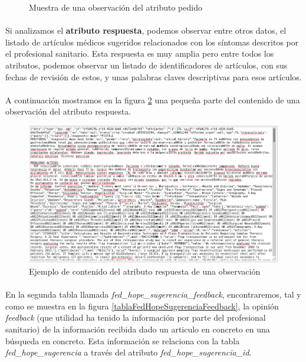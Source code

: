 \documentclass[10pt,a4paper,oneside]{book}
\begin{document}
\begin{figure}[!htb]
  \centering
    \lstset{inputencoding=utf8/latin1}
    
    \caption{Muestra de una observación del atributo pedido}
  \label{atributoPedido}
\end{figure}

\paragraph{}
Si analizamos el \textbf{atributo respuesta}, podemos observar entre otros datos, el listado de artículos médicos sugeridos relacionados con los síntomas descritos por el profesional sanitario. Esta respuesta es muy amplia pero entre todos los atributos, podemos observar un listado de identificadores de artículos, con sus fechas de revisión de estos, y unas palabras claves descriptivas para esos artículos.

\paragraph{}
A continuación mostramos en la figura \ref{atributoRespuesta} una pequeña parte del contenido de una observación del atributo respuesta.
\begin{figure}[!htb]
  \centering
    \includegraphics[width=15cm]{images/metodologia_tabla_fed_hope_sugerencia_attribute_respuesta.png}
    \caption{Ejemplo de contenido del atributo respuesta de una observación}
  \label{atributoRespuesta}
\end{figure}

\newpage
\paragraph{}
En la segunda tabla llamada \textit{fed\_hope\_sugerencia\_feedback}, encontraremos, tal y como se muestra en la figura \ref{tablaFedHopeSugerenciaFeedback}, la opinión \textit{feedback} (que utilidad ha tenido la información por parte del profesional sanitario) de la información recibida dado un articulo en concreto en una búsqueda en concreto. Esta información se relaciona con la tabla \textit{fed\_hope\_sugerencia} a través del atributo \textit{fed\_hope\_sugerencia\_id}.
\end{document}
